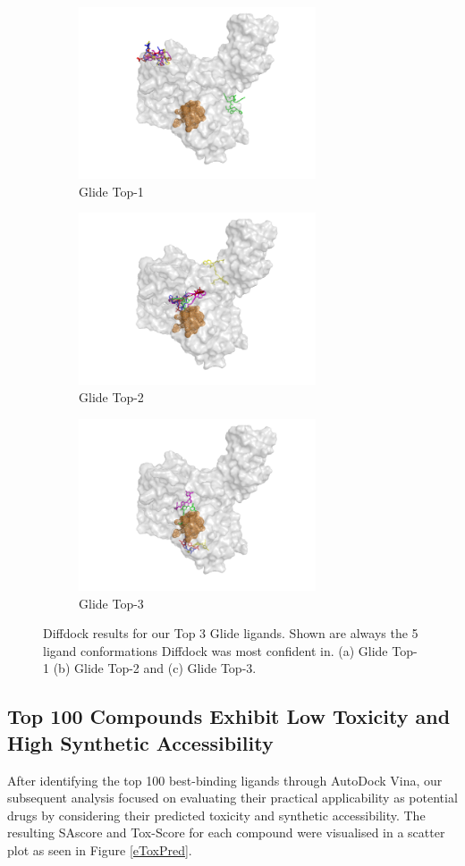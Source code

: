 \documentclass[11pt, letterpaper, titlepage]{article}
\begin{document}
\begin{figure}[h]
	\centering
	\begin{subfigure}{5cm}
		\centering\includegraphics[width=7cm]{Top1_Glide_Rank5}
		\caption{Glide Top-1}
	\end{subfigure}
	\begin{subfigure}{5cm}
		\centering\includegraphics[width=7cm]{Top2_Glide_Rank5}
		\caption{Glide Top-2}
	\end{subfigure}
	\begin{subfigure}{5cm}
		\centering\includegraphics[width=7cm]{Top3_Glide_Rank5}
		\caption{Glide Top-3}
	\end{subfigure}
	\caption{Diffdock results for our Top 3 Glide ligands. Shown are always the 5 ligand conformations Diffdock was most confident in. (a) Glide Top-1 (b) Glide Top-2 and (c) Glide Top-3.}\label{pymol_Top3}
\end{figure}

\subsection{Top 100 Compounds Exhibit Low Toxicity and High Synthetic Accessibility}
After identifying the top 100 best-binding ligands through AutoDock Vina, our subsequent analysis focused on evaluating their practical applicability as potential drugs by considering their predicted toxicity and synthetic accessibility. The resulting SAscore and Tox-Score for each compound were visualised in a scatter plot as seen in {Figure \ref{eToxPred}}. 
\end{document}
